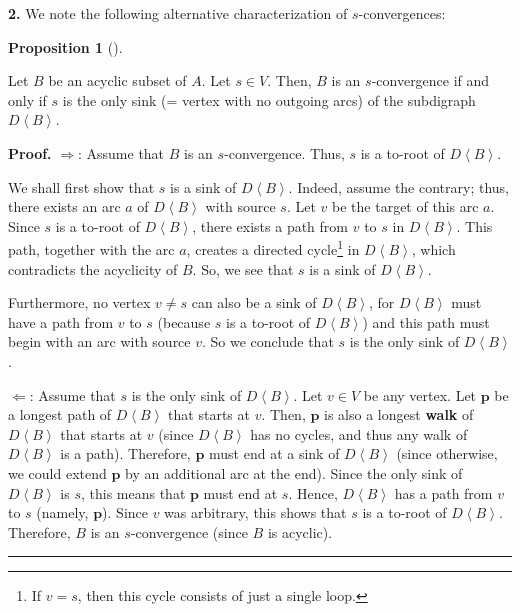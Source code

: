 \documentclass[numbers=enddot,12pt,final,onecolumn,notitlepage]{scrartcl}%
\theoremstyle{definition}
\newtheorem{prop}[theo]{Proposition}
\newenvironment{proposition}[1][]
{\begin{prop}[#1]\begin{leftbar}}
{\end{leftbar}\end{prop}}
\newenvironment{proof}[1][Proof]{\noindent\textbf{#1.} }{\ \rule{0.5em}{0.5em}}
\theoremstyle{plainsl}
\begin{document}
\textbf{2.} We note the following alternative characterization of $s$-convergences:

\begin{proposition}
\label{prop.s-conv.2}Let $B$ be an acyclic subset of $A$. Let $s\in V$. Then,
$B$ is an $s$-convergence if and only if $s$ is the only sink (= vertex with
no outgoing arcs) of the subdigraph $D\left\langle B\right\rangle $.
\end{proposition}

\begin{proof}
$\Longrightarrow$: Assume that $B$ is an $s$-convergence. Thus, $s$ is a
to-root of $D\left\langle B\right\rangle $.

We shall first show that $s$ is a sink of $D\left\langle B\right\rangle $.
Indeed, assume the contrary; thus, there exists an arc $a$ of $D\left\langle
B\right\rangle $ with source $s$. Let $v$ be the target of this arc $a$. Since
$s$ is a to-root of $D\left\langle B\right\rangle $, there exists a path from
$v$ to $s$ in $D\left\langle B\right\rangle $. This path, together with the
arc $a$, creates a directed cycle\footnote{If $v=s$, then this cycle consists
of just a single loop.} in $D\left\langle B\right\rangle $, which contradicts
the acyclicity of $B$. So, we see that $s$ is a sink of $D\left\langle
B\right\rangle $.

Furthermore, no vertex $v\neq s$ can also be a sink of $D\left\langle
B\right\rangle $, for $D\left\langle B\right\rangle $ must have a path from
$v$ to $s$ (because $s$ is a to-root of $D\left\langle B\right\rangle $) and
this path must begin with an arc with source $v$. So we conclude that $s$ is
the only sink of $D\left\langle B\right\rangle $. \medskip

$\Longleftarrow$: Assume that $s$ is the only sink of $D\left\langle
B\right\rangle $. Let $v\in V$ be any vertex. Let $\mathbf{p}$ be a longest
path of $D\left\langle B\right\rangle $ that starts at $v$. Then, $\mathbf{p}$
is also a longest \textbf{walk} of $D\left\langle B\right\rangle $ that starts
at $v$ (since $D\left\langle B\right\rangle $ has no cycles, and thus any walk
of $D\left\langle B\right\rangle $ is a path). Therefore, $\mathbf{p}$ must
end at a sink of $D\left\langle B\right\rangle $ (since otherwise, we could
extend $\mathbf{p}$ by an additional arc at the end). Since the only sink of
$D\left\langle B\right\rangle $ is $s$, this means that $\mathbf{p}$ must end
at $s$. Hence, $D\left\langle B\right\rangle $ has a path from $v$ to $s$
(namely, $\mathbf{p}$). Since $v$ was arbitrary, this shows that $s$ is a
to-root of $D\left\langle B\right\rangle $. Therefore, $B$ is an
$s$-convergence (since $B$ is acyclic).
\end{proof}
\end{document}
